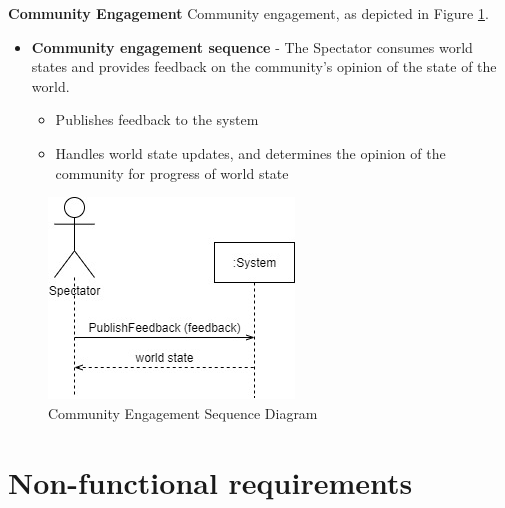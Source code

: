 \textbf{Community Engagement}
\newline
Community engagement, as depicted in Figure \ref{fig:CommunityEngagementSequenceDiagram}.
\begin{itemize}
\item \textbf{Community engagement sequence} - The Spectator consumes world states and provides feedback on the community's opinion of the state of the world.
   \begin{itemize}
     \item Publishes feedback to the system
     \item Handles world state updates, and determines the opinion of the community for progress of world state 
   \end{itemize}
\end{itemize}
\begin{figure}[H]
\centering
\includegraphics[scale=0.5]{images/CommunityEngagementSequenceDiagram.jpg}
\caption{Community Engagement Sequence Diagram}
\label{fig:CommunityEngagementSequenceDiagram}
\end{figure}


\chapter{Non-functional requirements}
\label{Functional requirements}
